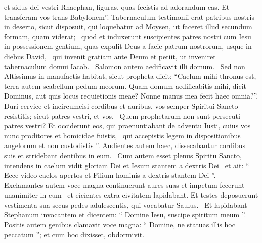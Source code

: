 \begin{biblechapter}
\begin{biblechapter}
\begin{biblechapter}
\begin{biblechapter}
\begin{biblechapter}
\begin{biblechapter}
\begin{biblechapter}
 et sidus dei vestri Rhaephan,
 figuras, quas fecistis ad adorandum eas.
 Et transferam vos trans Babylonem”.
 \verse Tabernaculum testimonii erat patribus nostris in deserto, sicut disposuit, qui loquebatur ad Moysen, ut faceret illud secundum formam, quam viderat; 
 \verse quod et induxerunt suscipientes patres nostri cum Iesu in possessionem gentium, quas expulit Deus a facie patrum nostrorum, usque in diebus David, 
 \verse qui invenit gratiam ante Deum et petiit, ut inveniret tabernaculum domui Iacob. 
 \verse Salomon autem aedificavit illi domum. 
 \verse Sed non Altissimus in manufactis habitat, sicut propheta dicit:
 \verse “Caelum mihi thronus est,
 terra autem scabellum pedum meorum.
 Quam domum aedificabitis mihi, dicit Dominus,
 aut quis locus requietionis meae?
 \verse Nonne manus mea fecit haec omnia?”.
 \verse Duri cervice et incircumcisi cordibus et auribus, vos semper Spiritui Sancto resistitis; sicut patres vestri, et vos. 
 \verse Quem prophetarum non sunt persecuti patres vestri? Et occiderunt eos, qui praenuntiabant de adventu Iusti, cuius vos nunc proditores et homicidae fuistis, 
 \verse qui accepistis legem in dispositionibus angelorum et non custodistis ”.
 \verse Audientes autem haec, dissecabantur cordibus suis et stridebant dentibus in eum. 
 \verse Cum autem esset plenus Spiritu Sancto, intendens in caelum vidit gloriam Dei et Iesum stantem a dextris Dei 
 \verse et ait: “ Ecce video caelos apertos et Filium hominis a dextris stantem Dei ”. 
 \verse Exclamantes autem voce magna continuerunt aures suas et impetum fecerunt unanimiter in eum 
 \verse et eicientes extra civitatem lapidabant. Et testes deposuerunt vestimenta sua secus pedes adulescentis, qui vocabatur Saulus. 
 \verse Et lapidabant Stephanum invocantem et dicentem: “ Domine Iesu, suscipe spiritum meum ”. 
 \verse Positis autem genibus clamavit voce magna: “ Domine, ne statuas illis hoc peccatum ”; et cum hoc dixisset, obdormivit.
 

\end{biblechapter}
\end{biblechapter}
\end{biblechapter}
\end{biblechapter}
\end{biblechapter}
\end{biblechapter}
\end{biblechapter}
